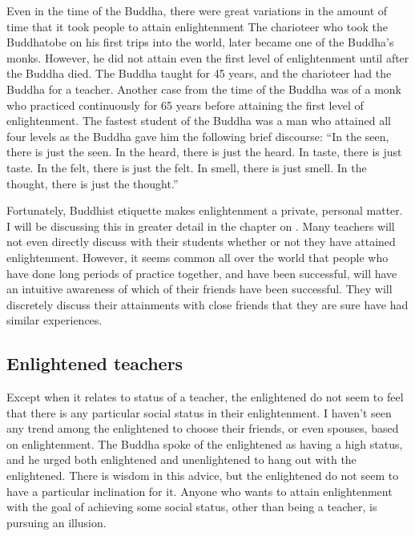 \documentclass[a5paper,10pt,english]{book}
\begin{document}
\sphinxAtStartPar
Even in the time of the Buddha, there were great variations in the
amount of time that it took people to attain enlightenment The
charioteer who took the Buddha\sphinxhyphen{}to\sphinxhyphen{}be on his first trips into the world,
later became one of the Buddha’s monks. However, he did not attain even
the first level of enlightenment until after the Buddha died. The Buddha
taught for 45 years, and the charioteer had the Buddha for a teacher.
Another case from the time of the Buddha was of a monk who practiced
continuously for 65 years before attaining the first level of
enlightenment. The fastest student of the Buddha was a man who attained
all four levels as the Buddha gave him the following brief discourse:
“In the seen, there is just the seen. In the heard, there is just the
heard. In taste, there is just taste. In the felt, there is just the
felt. In smell, there is just smell. In the thought, there is just the
thought.”

\sphinxAtStartPar
Fortunately, Buddhist etiquette makes enlightenment a private, personal
matter. I will be discussing this in greater detail in the chapter on
. Many teachers will not even directly
discuss with their students whether or not they have attained
enlightenment. However, it seems common all over the world that people
who have done long periods of practice together, and have been
successful, will have an intuitive awareness of which of their friends
have been successful. They will discretely discuss their attainments
with close friends that they are sure have had similar experiences.


\subsection{Enlightened teachers}
\label{\detokenize{saints:enlightened-teachers}}
\sphinxAtStartPar
Except when it relates to status of a teacher, the enlightened do not
seem to feel that there is any particular social status in their
enlightenment. I haven’t seen any trend among the enlightened to choose
their friends, or even spouses, based on enlightenment. The Buddha spoke
of the enlightened as having a high status, and he urged both
enlightened and unenlightened to hang out with the enlightened. There is
wisdom in this advice, but the enlightened do not seem to have a
particular inclination for it. Anyone who wants to attain enlightenment
with the goal of achieving some social status, other than being a
teacher, is pursuing an illusion.
\end{document}
